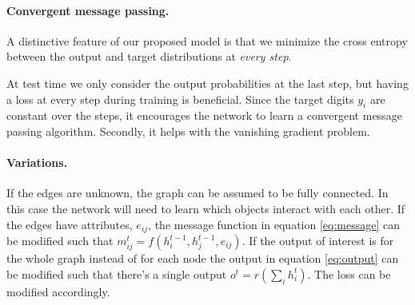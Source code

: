 \documentclass{article}
\newcommand{\rbp}[1]{

}
\newcommand{\ulrich}[1]{

}
\begin{document}
\paragraph{Convergent message passing.}
A distinctive feature of our proposed model is that we minimize the cross entropy between the output and target distributions at \emph{every step}.

At test time we only consider the output probabilities at the last step, but having a loss at every step during training is beneficial.
Since the target digits $y_i$ are constant over the steps, it encourages the network to learn a convergent message passing algorithm.
Secondly, it helps with the vanishing gradient problem.



\paragraph{Variations.}
If the edges are unknown, the graph can be assumed to be fully connected.
In this case the network will need to learn which objects interact with each other.
If the edges have attributes, $e_{ij}$, the message function in equation \ref{eq:message} can be modified such that $m_{ij}^t = f\left(h_i^{t-1}, h_j^{t-1}, e_{ij}\right)$.
If the output of interest is for the whole graph instead of for each node the output in equation \ref{eq:output} can be modified such that there's a single output $o^t = r\left(\sum_i h_i^t\right)$. The loss can be modified accordingly.
\end{document}
